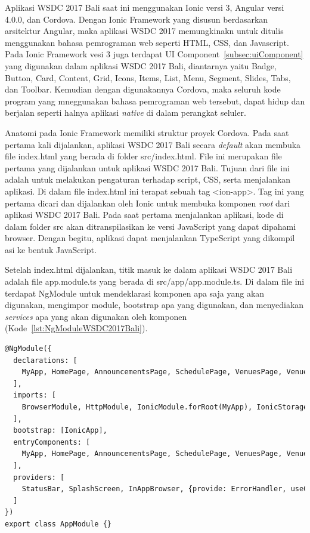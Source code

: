 Aplikasi WSDC 2017 Bali saat ini menggunakan Ionic versi 3, Angular versi 4.0.0, dan Cordova. Dengan Ionic Framework yang disusun berdasarkan arsitektur Angular, maka aplikasi WSDC 2017 memungkinakn untuk ditulis menggunakan bahasa pemrograman web seperti HTML, CSS, dan Javascript. Pada Ionic Framework vesi 3 juga terdapat UI Component~\ref{subsec:uiComponent} yang digunakan dalam aplikasi WSDC 2017 Bali, diantarnya yaitu Badge, Button, Card, Content, Grid, Icons, Items, List, Menu, Segment, Slides, Tabs, dan Toolbar. Kemudian dengan digunakannya Cordova, maka seluruh kode program yang mneggunakan bahasa pemrograman web tersebut, dapat hidup dan berjalan seperti halnya aplikasi \textit{native} di dalam perangkat seluler.

\newpage

Anatomi pada Ionic Framework memiliki struktur proyek Cordova. Pada saat pertama kali dijalankan, aplikasi WSDC 2017 Bali secara \textit{default} akan membuka file index.html yang berada di folder src/index.html. File ini merupakan file pertama yang dijalankan untuk aplikasi WSDC 2017 Bali. Tujuan dari file ini adalah untuk melakukan pengaturan terhadap script, CSS, serta menjalankan aplikasi. Di dalam file index.html ini terapat sebuah tag <ion-app>. Tag ini yang pertama dicari dan dijalankan oleh Ionic untuk  membuka komponen \textit{root} dari aplikasi WSDC 2017 Bali. Pada saat pertama menjalankan aplikasi, kode di dalam folder src akan ditranspilasikan ke versi JavaScript yang dapat dipahami browser. Dengan begitu, aplikasi dapat menjalankan TypeScript yang dikompil
asi ke bentuk JavaScript.

Setelah index.html dijalankan, titik masuk ke dalam aplikasi WSDC 2017 Bali adalah file app.module.ts yang berada di src/app/app.module.ts. Di dalam file ini terdapat NgModule untuk mendeklarasi komponen apa saja yang akan digunakan, mengimpor module, bootstrap apa yang digunakan, dan menyediakan \textit{services} apa yang akan digunakan oleh komponen (Kode~\ref{lst:NgModuleWSDC2017Bali}).  

\begin{lstlisting}[language=html, label={lst:NgModuleWSDC2017Bali}, caption=NgModule pada app.module.ts]
@NgModule({
  declarations: [
    MyApp, HomePage, AnnouncementsPage, SchedulePage, VenuesPage, VenuesMapPage, DrawPage, ResultPage, InfoPage
  ],
  imports: [
    BrowserModule, HttpModule, IonicModule.forRoot(MyApp), IonicStorageModule.forRoot(), CloudModule.forRoot(cloudSettings)
  ],
  bootstrap: [IonicApp],
  entryComponents: [
    MyApp, HomePage, AnnouncementsPage, SchedulePage, VenuesPage, VenuesMapPage, DrawPage, ResultPage, InfoPage
  ],
  providers: [
    StatusBar, SplashScreen, InAppBrowser, {provide: ErrorHandler, useClass: IonicErrorHandler}, Geolocation,
  ]
})
export class AppModule {}
\end{lstlisting} 

